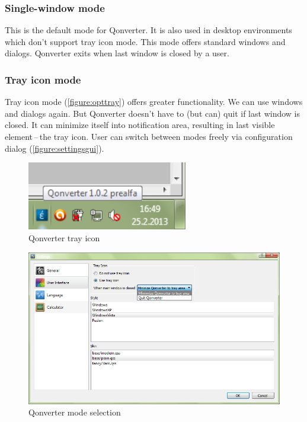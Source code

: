 \subsubsection{Single-window mode}
This is the default mode for Qonverter. It is also used in desktop environments which don't support tray icon mode. This mode offers standard windows and dialogs. Qonverter exits when last window is closed by a user.

\subsubsection{Tray icon mode}
Tray icon mode (\autoref{figure:opttray}) offers greater functionality. We can use windows and dialogs again. But Qonverter doesn't have to (but can) quit if last window is closed. It can minimize itself into notification area, resulting in last visible element\,--\,the tray icon. User can switch between modes freely via configuration dialog (\autoref{figure:settingsgui}).

\begin{figure}[ht]
\begin{center}
\includegraphics[width=7cm]{graphics/real-world/01-tray.png}
\caption{Qonverter tray icon}\label{figure:opttray}
\end{center}
\end{figure}

\begin{figure}[ht]
\begin{center}
\includegraphics[width=13cm]{graphics/real-world/02-settings-gui.png}
\caption{Qonverter mode selection}\label{figure:settingsgui}
\end{center}
\end{figure}

